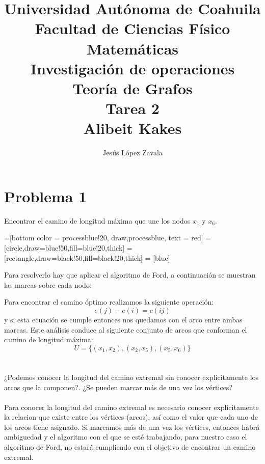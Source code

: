 \documentclass[autocontact]{gaceta}
\title{Universidad Autónoma de Coahuila \\ Facultad de Ciencias Físico Matemáticas
\\ Investigación de operaciones \\ Teoría de Grafos \\ Tarea 2 \\ Alibeit Kakes}
\author{Jesús López Zavala} %
\begin{document}
\maketitle





\section{Problema 1}
    Encontrar el camino de longitud máxima que une los nodos $x_{1}$ y $x_{6}$.
    
    =[bottom color = processblue!20, draw,processblue, text = red]
    =[circle,draw=blue!50,fill=blue!20,thick]
    =[rectangle,draw=black!50,fill=black!20,thick]
    = [blue]
    
    

    Para resolverlo hay que aplicar el algoritmo de Ford, a continuación se muestran las
    marcas sobre cada nodo:

    

    Para encontrar el camino óptimo realizamos la siguiente operación:
    $$ e(j) - e(i) = c(ij)$$
    y si esta ecuación se cumple entonces nos quedamos con el arco entre ambas marcas.
    Este análisis conduce al siguiente conjunto de arcos que conforman el camino de longitud máxima:
    $$ U = \{ (x_1, x_2), (x_2, x_5), (x_5, x_6) \} $$







\section{}
    ¿Podemos conocer la longitud del camino extremal sin conocer explícitamente los arcos que la 
    componen?. ¿Se pueden marcar más de una vez los vértices? \\
    \\Para conocer la longitud del camino extremal es necesario conocer explícitamente
        la relacion que existe entre los vértices (arcos), así como el valor que cada uno de los arcos tiene
        asignado. Si marcamos más de una vez los vértices, entonces habrá ambiguedad y el algoritmo con el que
        se esté trabajando, para nuestro caso el algoritmo de Ford, no estará cumpliendo con el objetivo de 
        encontrar un camino extremal.
\end{document}
